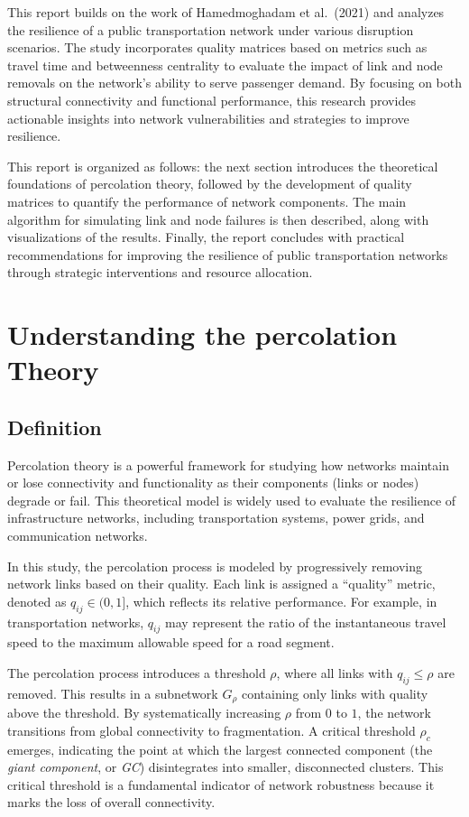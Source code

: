 \documentclass[
  letterpaper,
  DIV=11,
  numbers=noendperiod]{scrartcl}
\begin{document}
This report builds on the work of Hamedmoghadam et al.~(2021) and
analyzes the resilience of a public transportation network under various
disruption scenarios. The study incorporates quality matrices based on
metrics such as travel time and betweenness centrality to evaluate the
impact of link and node removals on the network's ability to serve
passenger demand. By focusing on both structural connectivity and
functional performance, this research provides actionable insights into
network vulnerabilities and strategies to improve resilience.

This report is organized as follows: the next section introduces the
theoretical foundations of percolation theory, followed by the
development of quality matrices to quantify the performance of network
components. The main algorithm for simulating link and node failures is
then described, along with visualizations of the results. Finally, the
report concludes with practical recommendations for improving the
resilience of public transportation networks through strategic
interventions and resource allocation.

\section{Understanding the percolation
Theory}\label{understanding-the-percolation-theory}

\subsection{Definition}\label{definition}

Percolation theory is a powerful framework for studying how networks
maintain or lose connectivity and functionality as their components
(links or nodes) degrade or fail. This theoretical model is widely used
to evaluate the resilience of infrastructure networks, including
transportation systems, power grids, and communication networks.

In this study, the percolation process is modeled by progressively
removing network links based on their quality. Each link is assigned a
``quality'' metric, denoted as \(q_{ij} \in (0,1]\), which reflects its
relative performance. For example, in transportation networks,
\(q_{ij}\) may represent the ratio of the instantaneous travel speed to
the maximum allowable speed for a road segment.

The percolation process introduces a threshold \(\rho\), where all links
with \(q_{ij} \leq \rho\) are removed. This results in a subnetwork
\(G_\rho\) containing only links with quality above the threshold. By
systematically increasing \(\rho\) from \(0\) to \(1\), the network
transitions from global connectivity to fragmentation. A critical
threshold \(\rho_c\) emerges, indicating the point at which the largest
connected component (the \emph{giant component}, or \emph{GC})
disintegrates into smaller, disconnected clusters. This critical
threshold is a fundamental indicator of network robustness because it
marks the loss of overall connectivity.
\end{document}
